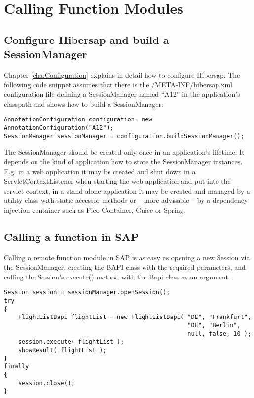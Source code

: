 \section{Calling Function Modules}

\subsection{Configure Hibersap and build a SessionManager}
Chapter \ref{cha:Configuration} explains in detail how to configure Hibersap. The following code snippet assumes that there is the /META-INF/hibersap.xml configuration file defining a SessionManager named ``A12'' in the application's classpath and shows how to build a SessionManager:


\begin{lstlisting}[caption=Building the SessionManager]
AnnotationConfiguration configuration= new AnnotationConfiguration("A12"); 
SessionManager sessionManager = configuration.buildSessionManager();
\end{lstlisting}
    
The SessionManager should be created only once in an application's lifetime. It depends on the kind of application how to store the SessionManager instances. E.g. in a web application it may be created and shut down in a ServletContextListener when starting the web application and put into the servlet context, in a stand-alone application it may be created and managed by a utility class with static accessor methods or -- more advisable -- by a dependency injection container such as Pico Container, Guice or Spring.


\subsection{Calling a function in SAP}

Calling a remote function module in SAP is as easy as opening a new Session via the SessionManager, creating the BAPI class with the required parameters, and calling the Session's execute() method with the Bapi class as an argument.

\begin{lstlisting}[caption=Executing the BAPI function]
Session session = sessionManager.openSession();
try
{
    FlightListBapi flightList = new FlightListBapi( "DE", "Frankfurt", 
                                                    "DE", "Berlin", 
                                                    null, false, 10 );
    session.execute( flightList );
    showResult( flightList );
}
finally
{
    session.close();
}
\end{lstlisting}

